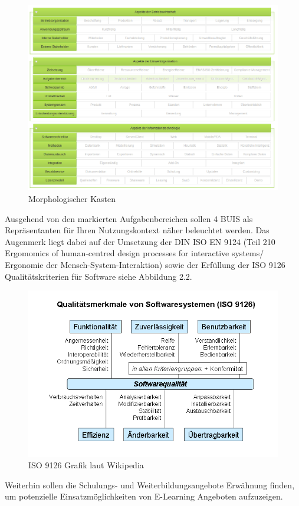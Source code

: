 \documentclass[a4paper, 12pt, twoside, BCOR=20mm, DIV=calc, abstracton, parskip=half*, toc=bibliography, toc=listof, headsepline, footsepline, headings=small, numbers=enddot]{scrreprt}
\begin{document}
\begin{figure}[h!]
	\includegraphics[width=\textwidth]{Bild/Morphologischer_Kasten_BUIS_Talus.png}
	\caption{Morphologischer Kasten}
\end{figure}

Ausgehend von den markierten Aufgabenbereichen sollen 4 \ac{BUIS} als Repräsentanten für Ihren Nutzungskontext näher beleuchtet werden. Das Augenmerk liegt dabei auf der Umsetzung der DIN ISO EN 9124 (Teil 210 Ergomomics of human-centred design processes for interactive systems/ Ergonomie der Mensch-System-Interaktion) \cite{ISO9241} sowie der Erfüllung der ISO 9126 Qualitätskriterien für Software siehe Abbildung 2.2.
\begin{figure}[ht]
	\centering
	\includegraphics[width=\textwidth]{Bild/ISO_9126_Grafik.png}
	\caption[ISO 9126 Grafik]{ISO 9126 Grafik laut Wikipedia} %
\end{figure} 
Weiterhin sollen die Schulungs- und Weiterbildungsangebote Erwähnung finden, um potenzielle Einsatzmöglichkeiten von E-Learning Angeboten aufzuzeigen.  
\end{document}
